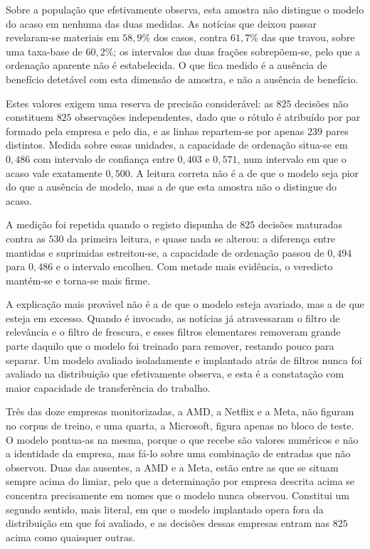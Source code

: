 Sobre a população que efetivamente observa, esta amostra não distingue o modelo do acaso em nenhuma
das duas medidas. As notícias que deixou passar revelaram-se materiais em $58{,}9\%$ dos casos,
contra $61{,}7\%$ das que travou, sobre uma taxa-base de $60{,}2\%$; os intervalos das duas frações
sobrepõem-se, pelo que a ordenação aparente não é estabelecida. O que fica medido é a ausência de
benefício detetável com esta dimensão de amostra, e não a ausência de benefício.

Estes valores exigem uma reserva de precisão considerável: as $825$ decisões
não constituem $825$ observações independentes, dado que o rótulo é atribuído por par formado pela
empresa e pelo dia, e as linhas repartem-se por apenas $239$ pares distintos. Medida sobre essas
unidades, a capacidade de ordenação situa-se em $0{,}486$ com intervalo de confiança entre $0{,}403$
e $0{,}571$, num intervalo em que o acaso vale exatamente $0{,}500$. A leitura correta não é a de que
o modelo seja pior do que a ausência de modelo, mas a de que esta amostra não o distingue do acaso.

A medição foi repetida quando o registo dispunha de $825$ decisões maturadas contra as $530$ da
primeira leitura, e quase nada se alterou: a diferença entre mantidas e suprimidas estreitou-se, a
capacidade de ordenação passou de $0{,}494$ para $0{,}486$ e o intervalo encolheu. Com metade mais
evidência, o veredicto mantém-se e torna-se mais firme.

A explicação mais provável não é a de que o modelo esteja avariado, mas a de que esteja em excesso.
Quando é invocado, as notícias já atravessaram o filtro de relevância e o filtro de frescura, e esses
filtros elementares removeram grande parte daquilo que o modelo foi treinado para remover, restando
pouco para separar. Um modelo avaliado isoladamente e implantado atrás de filtros nunca foi avaliado
na distribuição que efetivamente observa, e esta é a constatação com maior capacidade de
transferência do trabalho.

Três das doze empresas monitorizadas, a AMD, a Netflix e a Meta, não figuram no corpus de treino, e
uma quarta, a Microsoft, figura apenas no bloco de teste. O modelo pontua-as na mesma, porque o que
recebe são valores numéricos e não a identidade da empresa, mas fá-lo sobre uma combinação de
entradas que não observou. Duas das ausentes, a AMD e a Meta, estão entre as que se situam sempre
acima do limiar, pelo que a determinação por empresa descrita acima se concentra precisamente em
nomes que o modelo nunca observou. Constitui um segundo sentido, mais literal, em que o modelo
implantado opera fora da distribuição em que foi avaliado, e as decisões dessas empresas entram
nas $825$ acima como quaisquer outras.

